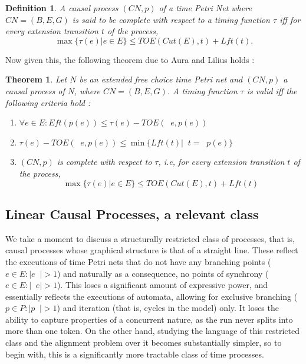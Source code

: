 \documentclass{article}
\DeclareMathOperator*{\pre}{^\bullet}
\newtheorem{theorem}{Theorem}
\theoremstyle{Definition}
\newtheorem{definition}{Definition}
\theoremstyle{definition}
\begin{document}
	\begin{definition} A causal process $(CN, p)$ of a time Petri Net where $CN = (B, E, G)$ is said to be \textit{complete} with respect to a timing function $\tau$ iff for every extension transition $t$ of the process, $$\max\{\tau(e)| e \in E\} \leq TOE(Cut(E), t) + Lft(t).$$
	\end{definition}
	
	Now given this, the following theorem due to Aura and Lilius \cite{AL97} holds : 
	
	\begin{theorem}\label{thm35}
		Let $N$ be an extended free choice time Petri net and $(CN, p)$ a causal process of $N$, where $CN = (B, E, G)$. A timing function $\tau$ is valid iff the following criteria hold : 
		
		\begin{enumerate}
			\item$ \forall e \in E :  Eft(p(e)) \leq \tau(e) - TOE(\pre e, p(e))$
			\item $\tau(e) - TOE(\pre e, p(e)) \leq  \min \{Lft(t) | \pre t = \pre p(e)\}$
			\item $(CN, p)$ is complete with respect to $\tau$, i.e, for every extension transition $t$ of the process, $$\max\{\tau(e)| e \in E\} \leq TOE(Cut(E), t) + Lft(t)$$
			
		\end{enumerate}
	\end{theorem}
	
	\subsection{Linear Causal Processes, a relevant class}
	
	We take a moment to discuss a structurally restricted class of processes, that is, causal processes whose graphical structure  is that of a straight line. 
	These reflect the executions of time Petri nets that do not have any branching points ($e \in E : |e \pre | > 1$) and naturally as a consequence, no points of synchrony ($e \in E : |\pre e| > 1$). 
	This loses a significant amount of expressive power, and essentially reflects the executions of automata, allowing for exclusive branching ($p \in P : |p \pre| > 1$) and iteration (that is, cycles in the model) only. 
	It loses the ability to capture properties of a concurrent nature, as the run never splits into more than one token. 
	On the other hand, studying the language of this restricted class and the alignment problem over it becomes substantially simpler, so to begin with, this is a significantly more tractable class of time processes. 
	
\end{document}
